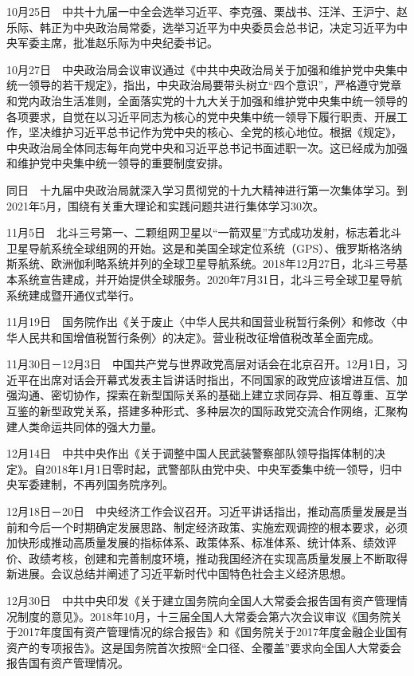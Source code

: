 \documentclass[10pt,a4paper,twocolumn]{book}
\begin{document}
10月25日　中共十九届一中全会选举习近平、李克强、栗战书、汪洋、王沪宁、赵乐际、韩正为中央政治局常委，选举习近平为中央委员会总书记，决定习近平为中央军委主席，批准赵乐际为中央纪委书记。

10月27日　中央政治局会议审议通过《中共中央政治局关于加强和维护党中央集中统一领导的若干规定》，指出，中央政治局要带头树立“四个意识”，严格遵守党章和党内政治生活准则，全面落实党的十九大关于加强和维护党中央集中统一领导的各项要求，自觉在以习近平同志为核心的党中央集中统一领导下履行职责、开展工作，坚决维护习近平总书记作为党中央的核心、全党的核心地位。根据《规定》，中央政治局全体同志每年向党中央和习近平总书记书面述职一次。这已经成为加强和维护党中央集中统一领导的重要制度安排。

同日　十九届中央政治局就深入学习贯彻党的十九大精神进行第一次集体学习。到2021年5月，围绕有关重大理论和实践问题共进行集体学习30次。

11月5日　北斗三号第一、二颗组网卫星以“一箭双星”方式成功发射，标志着北斗卫星导航系统全球组网的开始。这是和美国全球定位系统（GPS）、俄罗斯格洛纳斯系统、欧洲伽利略系统并列的全球卫星导航系统。2018年12月27日，北斗三号基本系统宣告建成，并开始提供全球服务。2020年7月31日，北斗三号全球卫星导航系统建成暨开通仪式举行。

11月19日　国务院作出《关于废止〈中华人民共和国营业税暂行条例〉和修改〈中华人民共和国增值税暂行条例〉的决定》。营业税改征增值税改革全面完成。

11月30日－12月3日　中国共产党与世界政党高层对话会在北京召开。12月1日，习近平在出席对话会开幕式发表主旨讲话时指出，不同国家的政党应该增进互信、加强沟通、密切协作，探索在新型国际关系的基础上建立求同存异、相互尊重、互学互鉴的新型政党关系，搭建多种形式、多种层次的国际政党交流合作网络，汇聚构建人类命运共同体的强大力量。

12月14日　中共中央作出《关于调整中国人民武装警察部队领导指挥体制的决定》。自2018年1月1日零时起，武警部队由党中央、中央军委集中统一领导，归中央军委建制，不再列国务院序列。

12月18日－20日　中央经济工作会议召开。习近平讲话指出，推动高质量发展是当前和今后一个时期确定发展思路、制定经济政策、实施宏观调控的根本要求，必须加快形成推动高质量发展的指标体系、政策体系、标准体系、统计体系、绩效评价、政绩考核，创建和完善制度环境，推动我国经济在实现高质量发展上不断取得新进展。会议总结并阐述了习近平新时代中国特色社会主义经济思想。

12月30日　中共中央印发《关于建立国务院向全国人大常委会报告国有资产管理情况制度的意见》。2018年10月，十三届全国人大常委会第六次会议审议《国务院关于2017年度国有资产管理情况的综合报告》和《国务院关于2017年度金融企业国有资产的专项报告》。这是国务院首次按照“全口径、全覆盖”要求向全国人大常委会报告国有资产管理情况。
\end{document}
